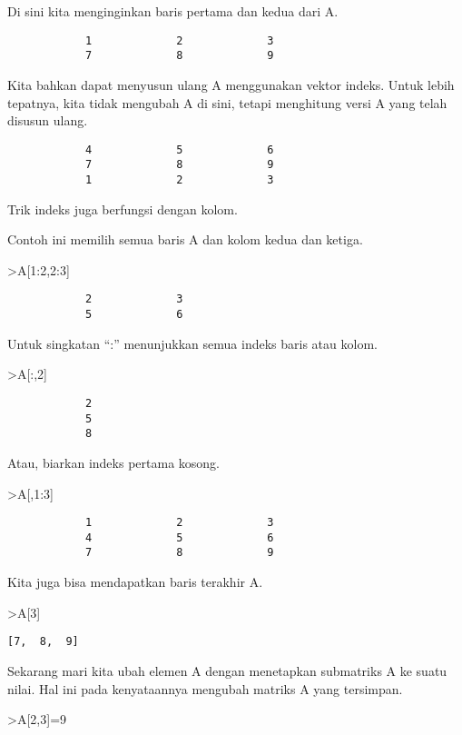 \documentclass[
]{book}
\begin{document}
Di sini kita menginginkan baris pertama dan kedua dari A.

\begin{verbatim}
            1             2             3 
            7             8             9 
\end{verbatim}

Kita bahkan dapat menyusun ulang A menggunakan vektor indeks. Untuk lebih tepatnya, kita tidak mengubah A di sini, tetapi menghitung versi A yang telah disusun ulang.

\begin{verbatim}
            4             5             6 
            7             8             9 
            1             2             3 
\end{verbatim}

Trik indeks juga berfungsi dengan kolom.

Contoh ini memilih semua baris A dan kolom kedua dan ketiga.

\textgreater A{[}1:2,2:3{]}

\begin{verbatim}
            2             3 
            5             6 
\end{verbatim}

Untuk singkatan ``:'' menunjukkan semua indeks baris atau kolom.

\textgreater A{[}:,2{]}

\begin{verbatim}
            2 
            5 
            8 
\end{verbatim}

Atau, biarkan indeks pertama kosong.

\textgreater A{[},1:3{]}

\begin{verbatim}
            1             2             3 
            4             5             6 
            7             8             9 
\end{verbatim}

Kita juga bisa mendapatkan baris terakhir A.

\textgreater A{[}3{]}

\begin{verbatim}
[7,  8,  9]
\end{verbatim}

Sekarang mari kita ubah elemen A dengan menetapkan submatriks A ke suatu nilai. Hal ini pada kenyataannya mengubah matriks A yang tersimpan.

\textgreater A{[}2,3{]}=9
\end{document}
